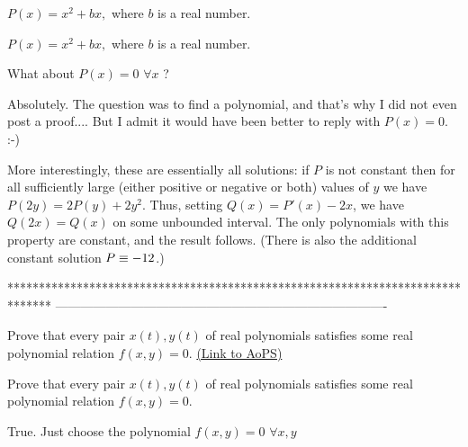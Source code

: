 \begin{solution}
	$P(x)=x^2+bx,$ where $b$ is a real number.
\end{solution}



\begin{solution}
	\begin{tcolorbox}$P(x)=x^2+bx,$ where $b$ is a real number.\end{tcolorbox}
What about $P(x)=0$ $\forall x$ ?
\end{solution}



\begin{solution}
	Absolutely. The question was to find a polynomial, and that's why I did not even post a proof.... But I admit it would have been better to reply with $P(x)=0.$ :-)
\end{solution}



\begin{solution}
	More interestingly, these are essentially all solutions: if $P$ is not constant then for all sufficiently large (either positive or negative or both) values of $y$ we have $P(2y)=2P(y)+2y^2$. Thus, setting $Q(x)=P'(x)-2x$, we have $Q(2x)=Q(x)$ on some unbounded interval.  The only polynomials with this property are constant, and the result follows.  (There is also the additional constant solution $P\equiv -1\/2$.)
\end{solution}
*******************************************************************************
-------------------------------------------------------------------------------

\begin{problem}
	Prove that every pair $ x(t), y(t) $ of real polynomials satisfies some real polynomial relation $ f(x, y)=0 $.
	\flushright \href{https://artofproblemsolving.com/community/c6h568558}{(Link to AoPS)}
\end{problem}



\begin{solution}
	\begin{tcolorbox}Prove that every pair $ x(t), y(t) $ of real polynomials satisfies some real polynomial relation $ f(x, y)=0 $.\end{tcolorbox}
True. 
Just choose the polynomial $f(x,y)=0$ $\forall x,y$
\end{solution}



